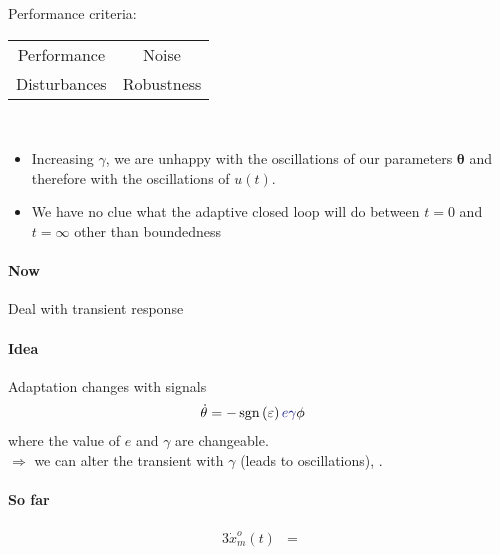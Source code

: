 Performance criteria:
\begin{center}
\begin{tabu} to \columnwidth {cc}
Performance & Noise\\
Disturbances    & Robustness
\end{tabu}
\end{center}~

\begin{itemize}
\item Increasing $\gamma$, we are unhappy with the
    oscillations of our parameters $\bm{\theta}$
    and therefore with the oscillations of $u(t)$.
\item We have no clue what the adaptive closed loop
    will do between $t=0$ and $t=\infty$ other than boundedness
\end{itemize}

\paragraph{Now} Deal with transient response
\paragraph{Idea} Adaptation changes with signals
\begin{alignat*}{3}
\dot{\theta} &= - \sgn{\varepsilon} \measuredVar{e \gamma} \phi
\end{alignat*}
where the value of $e$ and $\gamma$ are changeable.\\
$\Rightarrow$ we can alter the transient with $\gamma$ (leads to oscillations),
.

\paragraph{So far}
\begin{alignat*}{3}
\dot{x}_m^o(t) &= 
\end{alignat*}
